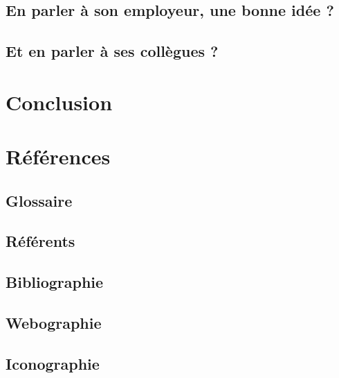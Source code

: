 \documentclass[a4paper, 11pt]{report}
\begin{document}
\subsection{En parler à son employeur, une bonne idée ?}

\subsection{Et en parler à ses collègues ?}

\clearpage

\section{Conclusion}

\clearpage

\section{Références}

\subsection{Glossaire}


\subsection{Référents}


\subsection{Bibliographie}


\subsection{Webographie}


\subsection{Iconographie}

\end{document}
